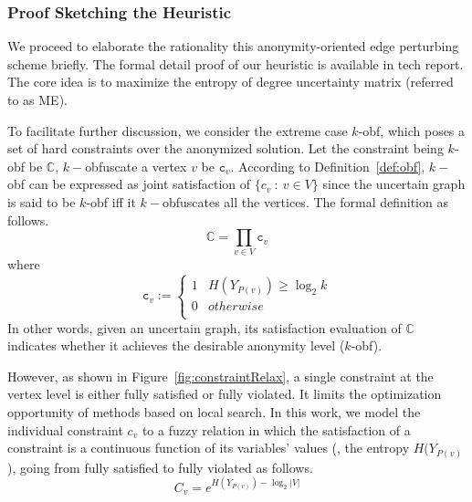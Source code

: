 \subsubsection{Proof Sketching the Heuristic}
\label{sec:prooooof}

We proceed to elaborate the rationality this anonymity-oriented edge perturbing scheme briefly. The formal detail proof of our heuristic is available in tech report. The core idea is to maximize the entropy of degree uncertainty matrix (referred to as ME). 

To facilitate further discussion, we consider the extreme case $k$-obf, which poses a set of hard constraints over the anonymized solution. Let the constraint being $k$-obf be $\mathbb{C}$, $k-$obfuscate a vertex $v$ be $\mathtt{c}_{v}$. 
According to Definition~\ref{def:obf}, $k-$obf can be expressed as joint satisfaction of $\lbrace c_{v}~:~v \in V \rbrace$ since the uncertain graph is said to be $k$-obf iff it $k-$obfuscates all the vertices. The formal definition as follows. 
\begin{equation}
    \mathbb{C}= \prod_{v \in V} \mathtt{c}_{v}
\end{equation}
where
\begin{equation*}
        \mathtt{c}_{v}:=
        \begin{cases}
                1  & H(Y_{P(v)}) \geq \log_{2}{k} \\
                0  & otherwise \\
         \end{cases}
\end{equation*}
In other words, given an uncertain graph, its satisfaction evaluation of $\mathbb{C}$ indicates whether it achieves the desirable anonymity level ($k$-obf).

However, as shown in Figure~\ref{fig:constraintRelax}, a single constraint at the vertex level is either fully satisfied or fully violated. It limits the optimization opportunity of methods based on local search. In this work, we model the individual constraint $c_{v}$ to a fuzzy relation in which the satisfaction of a constraint is a continuous function of its variables' values 
({\ie}, the entropy $H(Y_{P(v)}$),
going from fully satisfied to fully violated as follows. 
\begin{equation}
    C_{v} = e^{H(Y_{P(v)})-\log_{2}{|V|}}
    \label{eq:approximate}
\end{equation}

